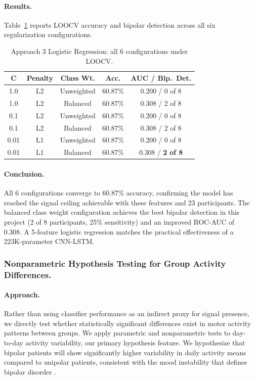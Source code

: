 \paragraph{Results.}
Table~\ref{tab:approach3_1c_results} reports LOOCV accuracy and bipolar detection across all six regularization configurations.

\begin{table}[H]
\centering
\caption{Approach 3 Logistic Regression: all 6 configurations under LOOCV.}
\label{tab:approach3_1c_results}
\small
\begin{tabular}{ccccc}
\toprule
\textbf{C} & \textbf{Penalty} & \textbf{Class Wt.} & \textbf{Acc.} & \textbf{AUC / Bip.\ Det.} \\
\midrule
1.0 & L2 & Unweighted & 60.87\% & 0.200 / 0 of 8 \\
1.0 & L2 & Balanced   & 60.87\% & 0.308 / 2 of 8 \\
0.1 & L2 & Unweighted & 60.87\% & 0.200 / 0 of 8 \\
0.1 & L2 & Balanced   & 60.87\% & 0.308 / 2 of 8 \\
0.01 & L1 & Unweighted & 60.87\% & 0.200 / 0 of 8 \\
0.01 & L1 & Balanced   & 60.87\% & 0.308 / \textbf{2 of 8} \\
\bottomrule
\end{tabular}
\end{table}

\paragraph{Conclusion.}
All 6 configurations converge to 60.87\% accuracy, confirming the model has reached the signal ceiling achievable with these features and 23 participants. The balanced class weight configuration achieves the best bipolar detection in this project (2 of 8 participants, 25\% sensitivity) and an improved ROC-AUC of 0.308. A 5-feature logistic regression matches the practical effectiveness of a 223K-parameter CNN-LSTM.

\subsubsection{Nonparametric Hypothesis Testing for Group Activity Differences.}

\paragraph{Approach.}
Rather than using classifier performance as an indirect proxy for signal presence, we directly test whether statistically significant differences exist in motor activity patterns between groups. We apply parametric and nonparametric tests to day-to-day activity variability, our primary hypothesis feature. We hypothesize that bipolar patients will show significantly higher variability in daily activity means compared to unipolar patients, consistent with the mood instability that defines bipolar disorder \cite{goodwin2007manic}.

